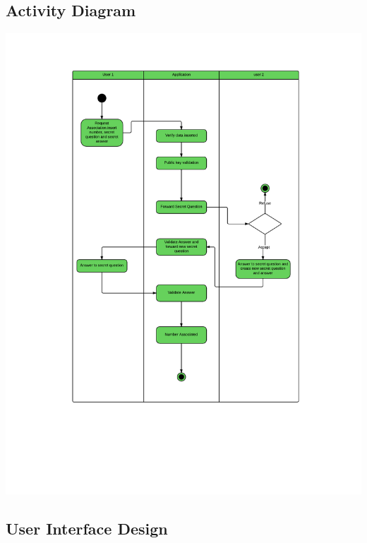 \newpage
\subsection{Activity Diagram}

\includegraphics[scale=0.7]{images/SMP_activity}

\newpage
\subsection{User Interface Design}

